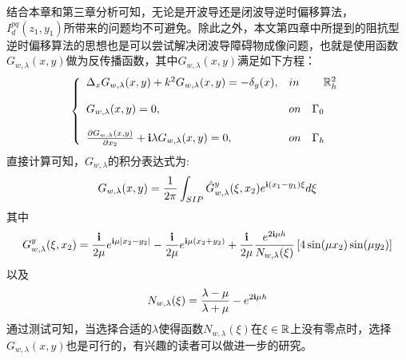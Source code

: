 \begin{remark}
	结合本章和第三章分析可知，无论是开波导还是闭波导逆时偏移算法，$I^{pq}_d(z_1,y_1)$所带来的问题均不可避免。除此之外，本文第四章中所提到的阻抗型逆时偏移算法的思想也是可以尝试解决闭波导障碍物成像问题，也就是使用函数$G_{w,\lambda}(x,y)$做为反传播函数，其中$G_{w,\lambda}(x,y)$满足如下方程：
\begin{eqnarray}\label{cwg_impedance}
\left\{
\begin{array}{lll}
\Delta_xG_{w,\lambda}(x,y)+k^2G_{w,\lambda}(x,y)=-\delta_y(x),&in&\quad \mathbb{R}^2_h\\
& &\\
G_{w,\lambda}(x,y)=0, &on&\Gamma_0\\
& &\\
\frac{\partial G_{w,\lambda}(x,y)}{\partial x_2}+\mathbf{i}\lambda G_{w,\lambda}(x,y)=0, &on&\Gamma_h
\end{array}
\right.
\end{eqnarray}
直接计算可知，$G_{w,\lambda}$的积分表达式为:
\begin{equation}
  G_{w,\lambda}(x,y)=\frac{1}{2\pi}\int_{SIP}\hat G^y_{w,\lambda}(\xi,x_2)e^{\mathbf{i}(x_1-y_1)\xi}d\xi
\end{equation}
其中
\begin{equation}
  G^y_{w,\lambda}(\xi,x_2)=\frac{\mathbf{i}}{2\mu}e^{\mathbf{i}\mu|x_2-y_2|}-\frac{\mathbf{i}}{2\mu}e^{\mathbf{i}\mu(x_2+y_2)}
  +\frac{\mathbf{i}}{2\mu}\frac{e^{2\mathbf{i}\mu h}}{N_{w,\lambda}(\xi)}\left[4\sin(\mu x_2)\sin(\mu y_2)\right]
\end{equation}
以及
\begin{equation}
 N_{w,\lambda}(\xi)=\frac{\lambda-\mu}{\lambda+\mu}-e^{2\mathbf{i}\mu h}
\end{equation}
通过测试可知，当选择合适的$\lambda$使得函数$N_{w,\lambda}(\xi)$在$\xi\in\mathbb{R}$上没有零点时，选择$G_{w,\lambda}(x,y)$也是可行的，有兴趣的读者可以做进一步的研究。
\end{remark}
